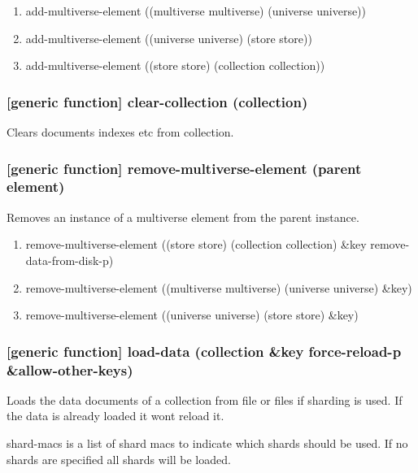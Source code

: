 \documentclass[11pt]{article}
\begin{document}
\begin{enumerate}
\item add-multiverse-element ((multiverse multiverse) (universe universe))
\label{sec:org4938991}
\item add-multiverse-element ((universe universe) (store store))
\label{sec:org7109b4e}
\item add-multiverse-element ((store store) (collection collection))
\label{sec:orgea844d2}
\end{enumerate}

\subsubsection{[generic function] clear-collection (collection)}
\label{sec:orga3e9999}

Clears documents indexes etc from collection.

\subsubsection{[generic function] remove-multiverse-element (parent element)}
\label{sec:orgd59719c}

Removes an instance of a multiverse element from the parent instance.

\begin{enumerate}
\item remove-multiverse-element ((store store) (collection collection) \&key remove-data-from-disk-p)
\label{sec:org6a17525}
\item remove-multiverse-element ((multiverse multiverse) (universe universe) \&key)
\label{sec:org1bd6203}
\item remove-multiverse-element ((universe universe) (store store) \&key)
\label{sec:org9908900}
\end{enumerate}


\subsubsection{[generic function] load-data (collection \&key force-reload-p \&allow-other-keys)}
\label{sec:org7a43de9}

Loads the data documents of a collection from file or files if
sharding is used. If the data is already loaded it wont reload it.

shard-macs is a list of shard macs to indicate which shards should be
used. If no shards are specified all shards will be loaded.
\end{document}
